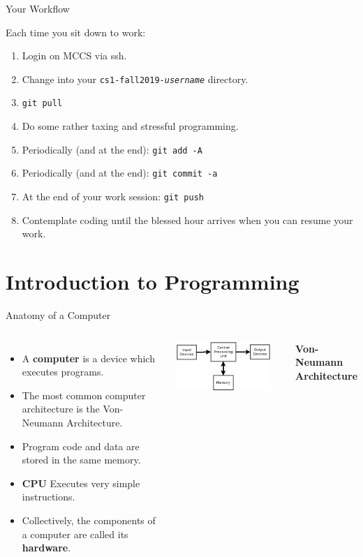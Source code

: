 \documentclass{beamer}
\begin{document}
\begin{frame}{Your Workflow}

Each time you sit down to work:
\begin{enumerate}[<+->]
    \item Login on MCCS via ssh.
    \item Change into your {\tt cs1-fall2019-{\em username}}
    directory.
    \item {\tt git pull}
    \item Do some rather taxing and stressful programming.
    \item Periodically (and at the end): {\tt git add -A}
    \item Periodically (and at the end): {\tt git commit -a}
    \item At the end of your work session: {\tt git push}
    \item Contemplate coding until the blessed hour arrives when you
    can resume your work.
\end{enumerate}
\end{frame}


\section{Introduction to Programming}
\begin{frame}{Anatomy of a Computer}
\begin{columns}
    \begin{itemize}[<+->]
        \item A {\bf computer} is a device which executes programs.
        \item The most common computer architecture is the Von-Neumann
            Architecture.
        \item Program code and data are stored in the same memory.
        \item {\bf CPU} Executes very simple instructions.
        \item Collectively, the components of a computer are called its
            {\bf hardware}.
    \end{itemize}
    \includegraphics[width=0.9\textwidth]{images/von-neumann}
    \begin{center}
        {\tiny\bf Von-Neumann Architecture}
    \end{center}
\end{columns}
\end{frame}
\end{document}
